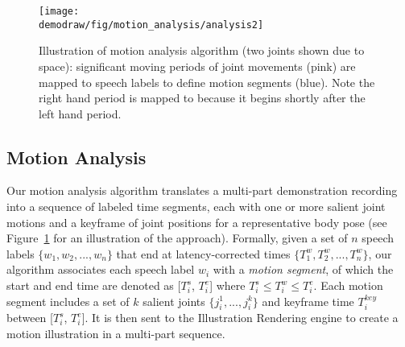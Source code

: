 
%


\begin{figure}[!t]
  \centering
  \texttt{[image: \\demodraw/fig/motion\_analysis/analysis2]}
  \caption{Illustration of motion analysis algorithm (two joints shown due to space): significant moving periods of joint movements (pink) are mapped to speech labels to define motion segments (blue). Note the right hand period is mapped to  because it begins shortly after the left hand period.}
   \label{fig:segmentation}
\end{figure}

\subsection {Motion Analysis}

Our motion analysis algorithm translates a multi-part demonstration recording into a sequence of labeled time segments, each with one or more salient joint motions and a keyframe of joint positions for a representative body pose (see Figure~\ref{fig:segmentation} for an illustration of the approach).
Formally, given a set of $n$ speech labels $\{w_1, w_2, ..., w_n\}$ that end at latency-corrected times $\{T_1^w, T_2^w, ..., T_n^w\}$, our algorithm associates each speech label $w_i$ with a \emph{motion segment}, of which the start and end time are denoted as [$T_i^s$, $T_i^e$] where $T_i^s \leq T_i^w \leq T_i^e$. Each motion segment includes a set of $k$ salient joints $\{j_i^1, ..., j_i^k\}$ and keyframe time $T_i^{key}$ between [$T_i^s$, $T_i^e$].
It is then sent to the Illustration Rendering engine to create a motion illustration in a multi-part sequence.

